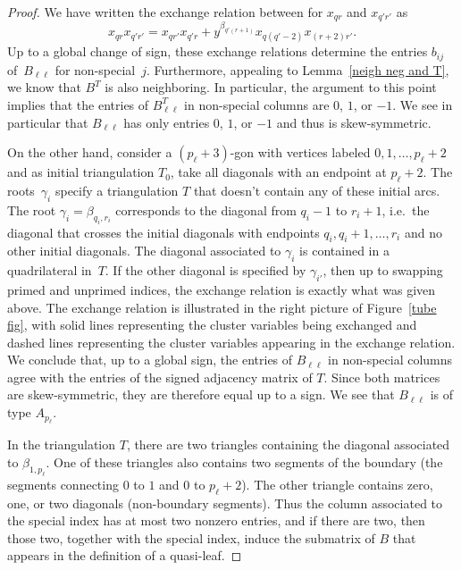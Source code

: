 \documentclass{amsart}
\theoremstyle{definition}
\theoremstyle{remark}
\numberwithin{equation}{section}
\newcommand{\0}{{\mathbf{0}}}
\begin{document}
\begin{proof}
We have written the exchange relation between for $x_{qr}$ and $x_{q'r'}$ as 
\begin{equation}\label{exch rel eq}
x_{qr}x_{q'r'}=x_{qr'}x_{q'r}+y^{\beta_{q'(r+1)}}x_{q(q'-2)}x_{(r+2)r'}.
\end{equation}
Up to a global change of sign, these exchange relations determine the entries $b_{ij}$ of~$B_{\ell\ell}$ for non-special~$j$.
Furthermore, appealing to Lemma~\ref{neigh neg and T}, we know that $B^T$ is also neighboring.
In particular, the argument to this point implies that the entries of $B_{\ell\ell}^T$ in non-special columns are $0$, $1$, or $-1$.
We see in particular that $B_{\ell\ell}$ has only entries $0$, $1$, or $-1$ and thus is skew-symmetric. 

On the other hand, consider a $(p_\ell+3)$-gon with vertices labeled $0,1,\ldots,p_\ell+2$ and as initial triangulation $T_0$, take all diagonals with an endpoint at $p_\ell+2$.
The roots~$\gamma_i$ specify a triangulation $T$ that doesn't contain any of these initial arcs.
The root $\gamma_i=\beta_{q_i,r_i}$ corresponds to the diagonal from $q_i-1$ to $r_i+1$, i.e.\ the diagonal that crosses the initial diagonals with endpoints $q_i,q_i+1,\ldots,r_i$ and no other initial diagonals.  
The diagonal associated to $\gamma_i$ is contained in a quadrilateral in~$T$.
If the other diagonal is specified by $\gamma_{i'}$, then up to swapping primed and unprimed indices, the exchange relation is exactly what was given above.
The exchange relation is illustrated in the right picture of Figure~\ref{tube fig}, with solid lines representing the cluster variables being exchanged and dashed lines representing the cluster variables appearing in the exchange relation.
We conclude that, up to a global sign, the entries of  $B_{\ell\ell}$ in non-special columns agree with the entries of the signed adjacency matrix of $T$.
Since both matrices are skew-symmetric, they are therefore equal up to a sign.
We see that $B_{\ell\ell}$ is of type $A_{p_\ell}$.

In the triangulation $T$, there are two triangles containing the diagonal associated to $\beta_{1,p_\ell}$.
One of these triangles also contains two segments of the boundary (the segments connecting $0$ to $1$ and $0$ to $p_\ell+2$).
The other triangle contains zero, one, or two diagonals (non-boundary segments).
Thus the column associated to the special index has at most two nonzero entries, and if there are two, then those two, together with the special index, induce the submatrix of $B$ that appears in the definition of a quasi-leaf.
\end{proof}
\end{document}
